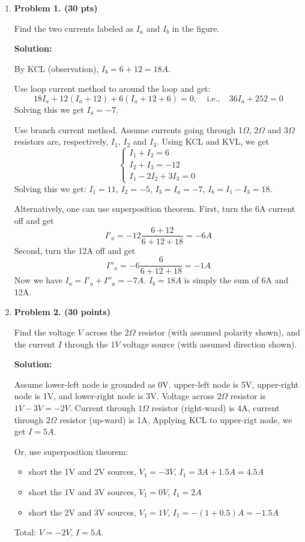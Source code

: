 \begin{enumerate}

\item {\bf Problem 1. (30 pts)}

  Find the two currents labeled as $I_a$ and $I_b$ in the figure.


  {\bf Solution:}

  By KCL (observation), $I_b=6+12=18A$. 

  Use loop current method to around the loop and get:
  \[ 18I_a+12(I_a+12)+6(I_a+12+6)=0,\;\;\;\;\mbox{i.e.,}\;\;\;\;
  36I_a+252=0 \]
  Solving this we get $I_a=-7$. 

  Use branch current method. Assume currents going through 1$\Omega$, 2$\Omega$ 
  and 3$\Omega$ resistors are, respectively, $I_1$, $I_2$ and $I_3$. Using KCL 
  and KVL, we get
  \[ \left\{ \begin{array}{l}
    I_1+I_2=6\\I_2+I_3=-12\\I_1-2 I_2+3I_3=0 \end{array} \right. \]
  Solving this we get: $I_1=11$, $I_2=-5$, $I_3=I_a=-7$, $I_b=I_1-I_3=18$.

  Alternatively, one can use superposition theorem. First, turn the 6A current 
  off and get 
  \[ I'_a=-12 \frac{6+12}{6+12+18}=-6 A \]
  Second, turn the 12A off and get
  \[ I''_a=-6 \frac{6}{6+12+18}=-1 A \]
  Now we have $I_a=I'_a+I''_a=-7 A$. $I_b=18A$ is simply the sum of 6A and 12A.

\item {\bf Problem 2. (30 points)}

  Find the voltage $V$ across the 2$\Omega$ resistor (with assumed polarity shown),
  and the current $I$ through the 1$V$ voltage source (with assumed direction shown).


  {\bf Solution:}

  Assume lower-left node is grounded as 0V. upper-left node is 5V, upper-right
  node is 1V, and lower-right node is 3V. Voltage across $2\Omega$ resistor is
  $1V-3V=-2V$. Current through $1\Omega$ resistor (right-ward) is 4A, current
  through $2\Omega$ resistor (up-ward) is 1A, Applying KCL to upper-rigt node,
  we get $I=5A$.

  Or, use superposition theorem:
  \begin{itemize}
    \item short the 1V and 2V sources, $V_1=-3V$, $I_1=3A+1.5A=4.5A$
    \item short the 1V and 3V sources, $V_1= 0V$, $I_1=  2A$
    \item short the 2V and 3V sources, $V_1= 1V$, $I_1=-(1+0.5)A=-1.5A$
  \end{itemize}
  Total: $V=-2V$, $I=5A$.


\end{enumerate}
